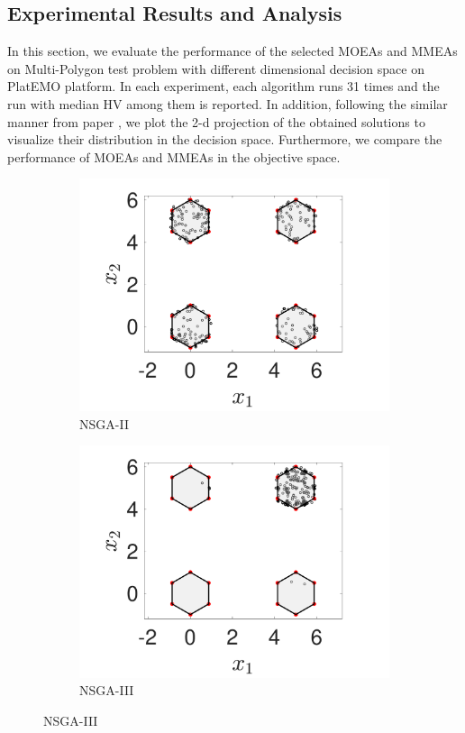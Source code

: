\documentclass[conference]{IEEEtran}
\begin{document}
\subsection{Experimental Results and Analysis}
\label{Experimental Results}
In this section, we evaluate the performance of the selected MOEAs and MMEAs on Multi-Polygon test problem with different dimensional decision space on PlatEMO platform\cite{PlatEMO}. In each experiment, each algorithm runs 31 times and the run with median HV among them is reported. In addition, following the similar manner from paper \cite{Hisao}, we plot the 2-d projection of the obtained solutions to visualize their distribution in the decision space. Furthermore, we compare the performance of MOEAs and MMEAs in the objective space.
\begin{figure}[htbp]
    \centering
    \begin{subfigure}[b]{.22\textwidth}
    \includegraphics[width=\linewidth]{Section5/dim2/PS/NSGAII}
    \caption{NSGA-II}
    \end{subfigure}
    \begin{subfigure}[b]{.22\textwidth}
    \includegraphics[width=\linewidth]{Section5/dim2/PS/NSGAIII}
    \caption{NSGA-III}
    \end{subfigure}
    

\end{figure}
\end{document}
